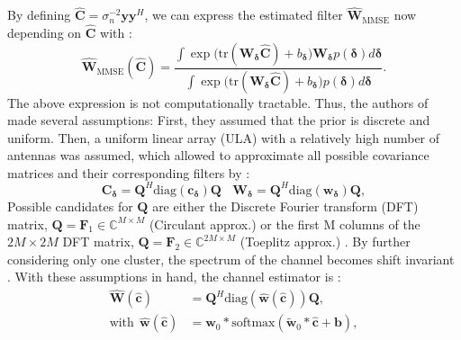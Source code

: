 \documentclass[12pt, draftclsnofoot, onecolumn]{IEEEtran}
\begin{document}
By defining $\hat{\mathbf{C}} = {\sigma^{-2}_n} \mathbf{y}\mathbf{y}^{H}$, we can express the estimated filter $\hat{\mathbf{W}}_{\text{MMSE}}$ now depending  on $\hat{\mathbf{C}}$ with \cite{Neumann}:
\begin{equation}
\hat{\mathbf{W}}_\text{MMSE}(\hat{\mathbf{C}}) =  \dfrac{\int \exp{(\mathrm{tr}( {\mathbf{W}}_{\boldsymbol{\delta}} \hat{\mathbf{C}})}+b_{\boldsymbol{\delta}}) {\mathbf{W}}_{\boldsymbol{\delta}} p({\boldsymbol{\delta}})  d{\boldsymbol{\delta}} } { \int \exp{(\mathrm{tr}( {\mathbf{W}}_{\boldsymbol{\delta}} \hat{\mathbf{C}})}+b_{\boldsymbol{\delta}}) p( {\boldsymbol{\delta}}) d{\boldsymbol{\delta}} }.
\end{equation}
The above expression is not computationally tractable. Thus, the authors of \cite{Neumann} made several assumptions: First, they assumed that the prior is discrete and uniform. Then, a uniform linear array (ULA) with a relatively high number of antennas was assumed, which allowed to approximate all possible covariance matrices and their corresponding filters by \cite{Neumann, Hellings}:
\begin{equation}
    {\mathbf{C}}_{\boldsymbol{\delta}} = \mathbf{Q}^H \mathrm{diag}(\mathbf{c}_{\boldsymbol{\delta}}) \mathbf{Q} \  \ \ \ {\mathbf{W}}_{\boldsymbol{\delta}} = \mathbf{Q}^H \mathrm{diag}(\mathbf{w}_{\boldsymbol{\delta}}) \mathbf{Q},
\end{equation}
Possible candidates for $\mathbf{Q}$ are either the Discrete Fourier transform (DFT) matrix, $\mathbf{Q} = \mathbf{F}_1 \in  \mathbb{C}^{M \times M}$ (Circulant approx.) or the first M columns of the $2M\times 2M$ DFT matrix, $\mathbf{Q} = \mathbf{F}_2 \in  \mathbb{C}^{2M \times M}$ (Toeplitz approx.) \cite{Neumann, Gray2006}. By further considering only one cluster, the spectrum of the channel becomes shift invariant \cite{Neumann}. With these assumptions in hand, the channel estimator is \cite{Neumann}:
\begin{align}
    \hat{\mathbf{W}}(\hat{\mathbf{c}}) &= \mathbf{Q}^H \mathrm{diag}(\hat{\mathbf{w}}(\hat{\mathbf{c}})) \mathbf{Q},  \label{LCEFastEstimator} \\
    \text{with} \ \  \hat{\mathbf{w}}(\hat{\mathbf{c}}) &= \mathbf{w}_0 * \text{softmax}(\tilde{\mathbf{w}}_0*\hat{\mathbf{c}}+\mathbf{b}),
\end{align}
\end{document}
